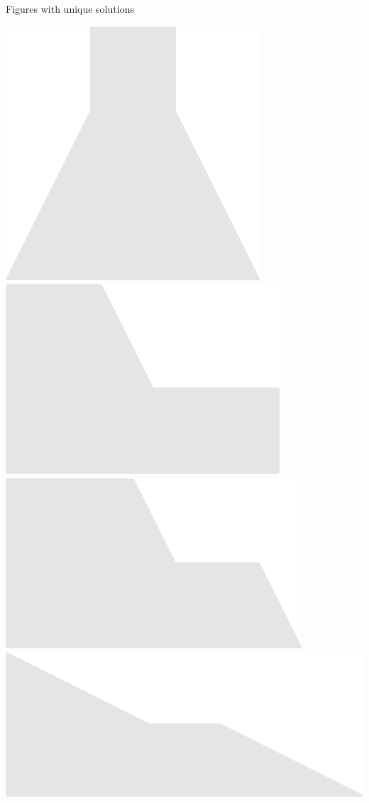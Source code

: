 \documentclass[14pt]{beamer}
\begin{document}
\begin{frame}{Figures with unique solutions}
\begin{center}
            \includegraphics[scale=0.40]{figures/figure022u.pdf} \\[3ex]
            \includegraphics[scale=0.40]{figures/figure022w.pdf}\quad
            \includegraphics[scale=0.40]{figures/figure022x.pdf}\quad
            \includegraphics[scale=0.40]{figures/figure022y.pdf} \\


\end{center}
\end{frame}
\end{document}

